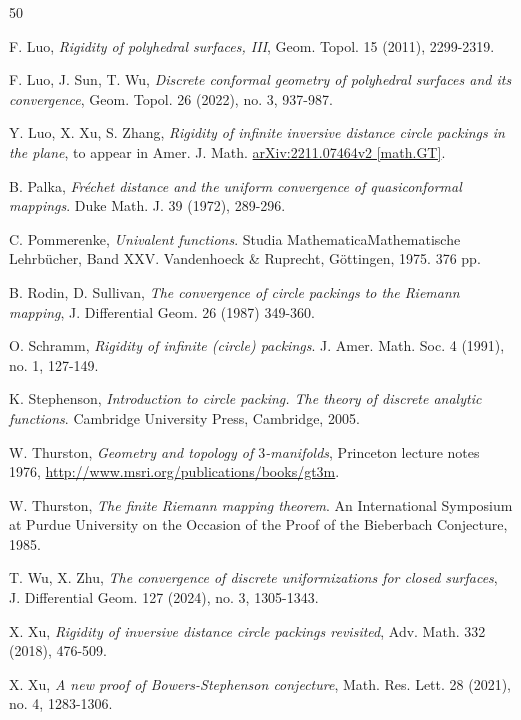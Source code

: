 \documentclass[12pt]{amsart}
\begin{document}
\begin{thebibliography}{50}


 F. Luo, \emph{Rigidity of polyhedral surfaces, III}, Geom. Topol. 15 (2011), 2299-2319.

 F. Luo, J. Sun, T. Wu,  \emph{Discrete conformal geometry of polyhedral surfaces and its convergence}, Geom. Topol. 26 (2022), no. 3, 937-987.

  Y. Luo, X. Xu, S. Zhang, \emph{Rigidity of infinite inversive distance circle packings in the plane}, to appear in Amer. J. Math. \href{https://arxiv.org/abs/2211.07464}{ arXiv:2211.07464v2 [math.GT]}.


 B. Palka,  \emph{Fr\'{e}chet distance and the uniform convergence of quasiconformal mappings}. Duke Math. J. 39 (1972), 289-296.

 C. Pommerenke, \emph{Univalent functions}. Studia MathematicaMathematische Lehrb\"{u}cher, Band XXV. Vandenhoeck \& Ruprecht, G\"{o}ttingen, 1975. 376 pp.

 B. Rodin, D. Sullivan, \emph{The convergence of circle packings to the Riemann mapping}, J. Differential Geom. 26 (1987) 349-360.


 O. Schramm, \emph{Rigidity of infinite (circle) packings}. J. Amer. Math. Soc. 4 (1991), no. 1, 127-149.


 K. Stephenson, \emph{Introduction to circle packing. The theory of discrete analytic functions}. Cambridge University Press, Cambridge, 2005.

 W. Thurston, \emph{Geometry and topology of $3$-manifolds}, Princeton lecture notes 1976, \href{http://www.msri.org/publications/books/gt3m}{http://www.msri.org/publications/books/gt3m}.

 W. Thurston,  \emph{The finite Riemann mapping theorem}. An International Symposium at Purdue University on the Occasion of the Proof of the Bieberbach Conjecture, 1985.


  T. Wu, X. Zhu, \emph{The convergence of discrete uniformizations for closed surfaces}, J. Differential Geom. 127 (2024), no. 3, 1305-1343.

 X. Xu, \emph{Rigidity of inversive distance circle packings revisited}, Adv. Math. 332 (2018), 476-509.

 X. Xu, \emph{A new proof of Bowers-Stephenson conjecture}, Math. Res. Lett. 28 (2021), no. 4, 1283-1306.




\end{thebibliography}

	
\end{document}
